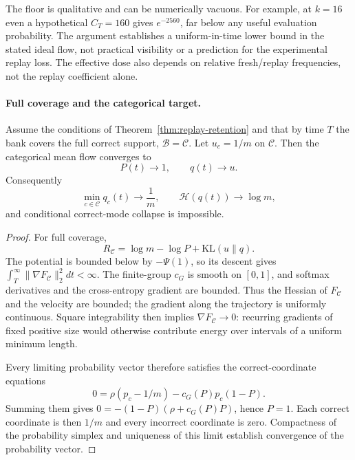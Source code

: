 The floor is qualitative and can be numerically vacuous. For example, at
$k=16$ even a hypothetical $C_T=160$ gives $e^{-2560}$, far below any useful
evaluation probability. The argument establishes a uniform-in-time lower
bound in the stated ideal flow, not practical visibility or a prediction for
the experimental replay loss. The effective dose also depends on relative
fresh/replay frequencies, not the replay coefficient alone.

\paragraph{Full coverage and the categorical target.}
\begin{corollary}
\label{cor:replay-no-collapse}
Assume the conditions of Theorem~\ref{thm:replay-retention} and that by time
$T$ the bank covers the full correct support, $\mathcal B=\mathcal C$. Let
$u_c=1/m$ on $\mathcal C$. Then the categorical mean flow converges to
\[
  P(t)\longrightarrow1,
  \qquad q(t)\longrightarrow u.
\]
Consequently
\[
  \min_{c\in\mathcal C}q_c(t)\longrightarrow\frac1m,
  \qquad
  \mathcal H(q(t))\longrightarrow\log m,
\]
and conditional correct-mode collapse is impossible.
\end{corollary}

\begin{proof}
For full coverage,
\begin{equation}
 R_{\mathcal C}=\log m-\log P+\mathrm{KL}(u\|q).
 \label{eq:replay-mass-uniformity-decomposition}
\end{equation}
The potential is bounded below by $-\Psi(1)$, so its descent gives
$\int_T^\infty\|\nabla F_{\mathcal C}\|_2^2dt<\infty$. The finite-group
$c_G$ is smooth on $[0,1]$, and softmax derivatives and the cross-entropy
gradient are bounded. Thus the Hessian of $F_{\mathcal C}$ and the velocity
are bounded; the gradient along the trajectory is uniformly continuous.
Square integrability then implies $\nabla F_{\mathcal C}\to0$: recurring
gradients of fixed positive size would otherwise contribute energy over
intervals of a uniform minimum length.

Every limiting probability vector therefore satisfies the correct-coordinate
equations
\[
 0=\rho(p_c-1/m)-c_G(P)p_c(1-P).
\]
Summing them gives $0=-(1-P)(\rho+c_G(P)P)$, hence $P=1$. Each correct
coordinate is then $1/m$ and every incorrect coordinate is zero. Compactness
of the probability simplex and uniqueness of this limit establish convergence
of the probability vector.
\end{proof}

